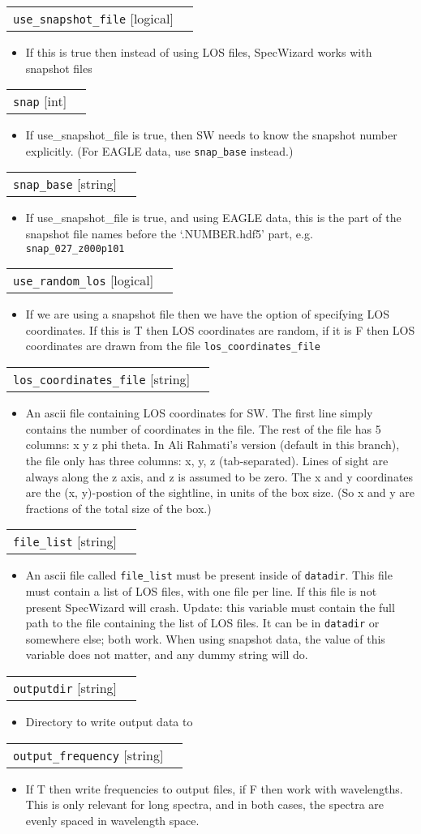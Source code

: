 \documentclass{report}
\makeatletter
\newcommand{\paramdefinition}[3]{
\begin{tabular*}{\textwidth}{l@{\extracolsep{\fill}}r}
		{\tt #1} [{\sc #2}]& #3 \\
\end{tabular*}}
\newcommand{\paramdescription}[1]{
\begin{itemize}
\item #1
\end{itemize}\vspace{0.2cm}}
\newcommand{\param}[1]{{\tt #1}}
\makeatother
\begin{document}
\paramdefinition{use\_snapshot\_file}{logical}{}
\paramdescription{If this is true then instead of using LOS files, SpecWizard works with snapshot files}

\paramdefinition{snap}{int}{}
\paramdescription{If use\_snapshot\_file is true, then SW needs to know the snapshot number explicitly. (For EAGLE data, use \param{snap\_base} instead.)}

\paramdefinition{snap\_base}{string}{}
\paramdescription{If use\_snapshot\_file is true, and using EAGLE data, this is the part of the snapshot file names before the `.NUMBER.hdf5' part, e.g. \param{snap\_027\_z000p101}}

\paramdefinition{use\_random\_los}{logical}{}
\paramdescription{If we are using a snapshot file then we have the option of specifying LOS coordinates.  If this is T then LOS coordinates are random, if it is F then LOS coordinates are drawn from the file {\tt los\_coordinates\_file}}

\paramdefinition{los\_coordinates\_file}{string}{}
\paramdescription{An ascii file containing LOS coordinates for SW. The first line simply contains the number of coordinates in the file. The rest of the file has 5 columns: x y z phi theta. In Ali Rahmati's version (default in this branch), the file only has three columns: x, y, z (tab-separated). Lines of sight are always along the z axis, and z is assumed to be zero. The x and y coordinates are the (x, y)-postion of the sightline, in units of the box size. (So x and y are fractions of the total size of the box.)}

\paramdefinition{file\_list}{string}{}
\paramdescription{An ascii file called {\tt file\_list} must be present inside of {\tt datadir}.  This file must contain a list of LOS files, with one file per line.  If this file is not present SpecWizard will crash. Update: this variable must contain the full path to the file containing the list of LOS files. It can be in \param{datadir} or somewhere else; both work. When using snapshot data, the value of this variable does not matter, and any dummy string will do.}

\paramdefinition{outputdir}{string}{}
\paramdescription{Directory to write output data to}

\paramdefinition{output\_frequency}{string}{}
\paramdescription{If T then write frequencies to output files, if F then work with wavelengths. This is only relevant for long spectra, and in both cases, the spectra are evenly spaced in wavelength space.}
\end{document}
